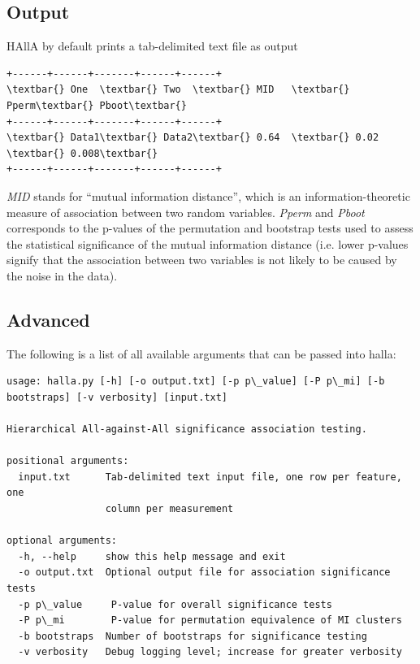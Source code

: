 \documentclass[letterpaper,10pt,english]{sphinxmanual}
\begin{document}
\subsection{Output}
\label{index:output}
HAllA by default prints a tab-delimited text file as output

\begin{Verbatim}[commandchars=\\\{\}]
+------+------+-------+------+------+
\textbar{} One  \textbar{} Two  \textbar{} MID   \textbar{} Pperm\textbar{} Pboot\textbar{}
+------+------+-------+------+------+
\textbar{} Data1\textbar{} Data2\textbar{} 0.64  \textbar{} 0.02 \textbar{} 0.008\textbar{}
+------+------+-------+------+------+
\end{Verbatim}

\emph{MID} stands for ``mutual information distance'', which is an information-theoretic measure of association between two random variables. \emph{Pperm} and \emph{Pboot} corresponds to the p-values of the permutation and bootstrap tests used to assess the statistical significance of the mutual information distance (i.e. lower p-values signify that the association between two variables
is not likely to be caused by the noise in the data).


\subsection{Advanced}
\label{index:advanced}
The following is a list of all available arguments that can be passed into halla:

\begin{Verbatim}[commandchars=\\\{\}]
usage: halla.py [-h] [-o output.txt] [-p p\_value] [-P p\_mi] [-b bootstraps] [-v verbosity] [input.txt]

Hierarchical All-against-All significance association testing.

positional arguments:
  input.txt      Tab-delimited text input file, one row per feature, one
                 column per measurement

optional arguments:
  -h, --help     show this help message and exit
  -o output.txt  Optional output file for association significance tests
  -p p\_value     P-value for overall significance tests
  -P p\_mi        P-value for permutation equivalence of MI clusters
  -b bootstraps  Number of bootstraps for significance testing
  -v verbosity   Debug logging level; increase for greater verbosity
\end{Verbatim}
\end{document}
